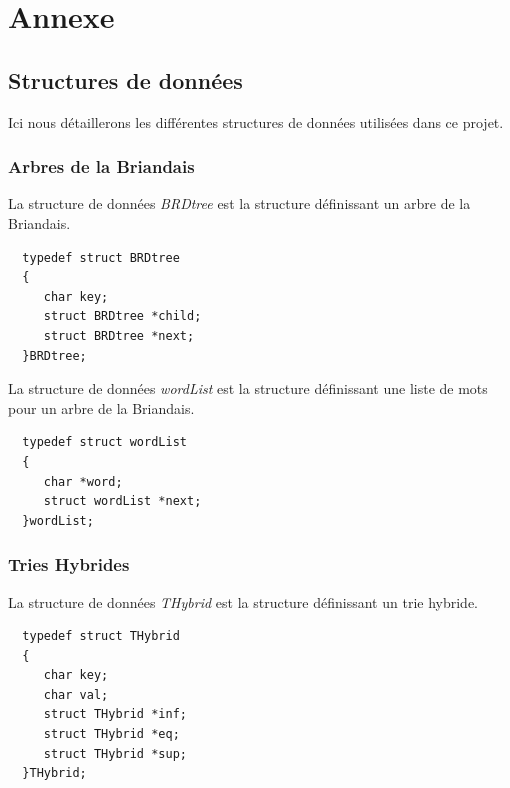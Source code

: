 \documentclass[a4paper,8pt]{report}
\begin{document}
\chapter{Annexe}
\section*{Structures de donn\'ees}\label{sec:name}

Ici nous d\'etaillerons les diff\'erentes structures de donn\'ees utilis\'ees dans ce projet.

\subsection*{Arbres de la Briandais}\label{sec:name}

La structure de donn\'ees \textit{BRDtree} est la structure d\'efinissant un arbre de la Briandais.
\begin{verbatim}
  typedef struct BRDtree
  {
     char key; 
     struct BRDtree *child; 
     struct BRDtree *next; 
  }BRDtree;
\end{verbatim}

La structure de donn\'ees \textit{wordList} est la structure d\'efinissant une liste de mots pour un arbre de la Briandais.
\begin{verbatim}
  typedef struct wordList
  {
     char *word;
     struct wordList *next;
  }wordList;
\end{verbatim}

\subsection*{Tries Hybrides}\label{sec:name}

La structure de donn\'ees \textit{THybrid} est la structure d\'efinissant un trie hybride.
\begin{verbatim}
  typedef struct THybrid
  {
     char key;
     char val;
     struct THybrid *inf;
     struct THybrid *eq;
     struct THybrid *sup;
  }THybrid;
\end{verbatim}

\listoffigures
\newpage
\end{document}

